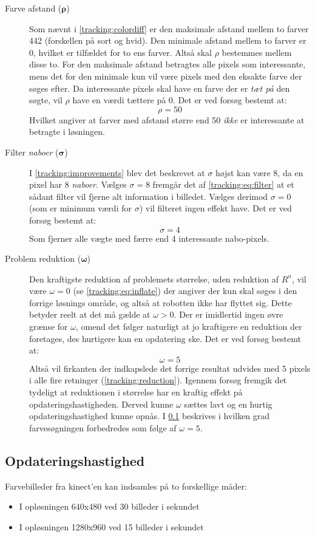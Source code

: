 \begin{description}
\item[Farve afstand (${\boldsymbol{\rho}}$)]
Som nævnt i \cref{tracking:colordiff} er den maksimale afstand mellem to farver 442 (forskellen på sort og hvid).
Den minimale afstand mellem to farver er 0, hvilket er tilfældet for to ens farver.
Altså skal $\rho$ bestemmes mellem disse to.
For den maksimale afstand betragtes alle pixels som interessante, mens det for den minimale kun vil være pixels med den eksakte farve der søges efter.
Da interessante pixels skal have en farve der er \emph{tæt på} den søgte, vil $\rho$ have en værdi tættere på 0.
Det er ved forsøg bestemt at:
$$\rho = 50$$
Hvilket angiver at farver med afstand større end 50 \emph{ikke} er interessante at betragte i løsningen.

\item[Filter \textit{naboer} ($\boldsymbol{\sigma}$)]
I \cref{tracking:improvements} blev det beskrevet at $\sigma$ højst kan være 8, da en pixel har 8 \emph{naboer}.
Vælges $\sigma = 8$ fremgår det af \cref{tracking:eq:filter} at et sådant filter vil fjerne alt information i billedet.
Vælges derimod $\sigma = 0$ (som er minimum værdi for $\sigma$) vil filteret ingen effekt have.
Det er ved forsøg bestemt at:
$$\sigma = 4$$
Som fjerner alle vægte med færre end 4 interessante nabo-pixels.

\item[Problem reduktion ($\boldsymbol{\omega}$)]
Den kraftigste reduktion af problemets størrelse, uden reduktion af $R^n$, vil være $\omega = 0$ (se \cref{tracking:eq:inflate}) der angiver der kun skal søges i den forrige løsnings område, og altså at robotten ikke har flyttet sig.
Dette betyder reelt at det må gælde at $\omega > 0$.
Der er imidlertid ingen øvre grænse for $\omega$, omend det følger naturligt at jo kraftigere en reduktion der foretages, des hurtigere kan en opdatering ske.
Det er ved forsøg bestemt at:
$$\omega = 5$$
Altså vil firkanten der indkapslede det forrige resultat udvides med 5 pixels i alle fire retninger (\cref{tracking:reduction}).
Igennem forsøg fremgik det tydeligt at reduktionen i størrelse har en kraftig effekt på opdateringshastigheden.
Derved kunne $\omega$ sættes lavt og en hurtig opdateringshastighed kunne opnås.
I \cref{tracking:updatespeed} beskrives i hvilken grad farvesøgningen forbedredes som følge af $\omega = 5$.
\end{description}

\subsection{Opdateringshastighed}\label{tracking:updatespeed}
Farvebilleder fra kinect'en kan indsamles på to forskellige måder:
\begin{itemize}
\item I opløsningen 640x480 ved 30 billeder i sekundet
\item I opløsningen 1280x960 ved 15 billeder i sekundet
\end{itemize}

